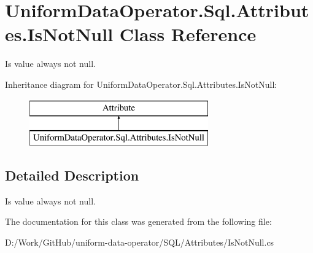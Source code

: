 \hypertarget{class_uniform_data_operator_1_1_sql_1_1_attributes_1_1_is_not_null}{}\section{Uniform\+Data\+Operator.\+Sql.\+Attributes.\+Is\+Not\+Null Class Reference}
\label{class_uniform_data_operator_1_1_sql_1_1_attributes_1_1_is_not_null}


Is value always not null.  


Inheritance diagram for Uniform\+Data\+Operator.\+Sql.\+Attributes.\+Is\+Not\+Null\+:\begin{figure}[H]
\begin{center}
\leavevmode
\includegraphics[height=2.000000cm]{d4/d02/class_uniform_data_operator_1_1_sql_1_1_attributes_1_1_is_not_null}
\end{center}
\end{figure}


\subsection{Detailed Description}
Is value always not null. 



The documentation for this class was generated from the following file\+:\begin{DoxyCompactItemize}
\item 
D\+:/\+Work/\+Git\+Hub/uniform-\/data-\/operator/\+S\+Q\+L/\+Attributes/Is\+Not\+Null.\+cs\end{DoxyCompactItemize}
